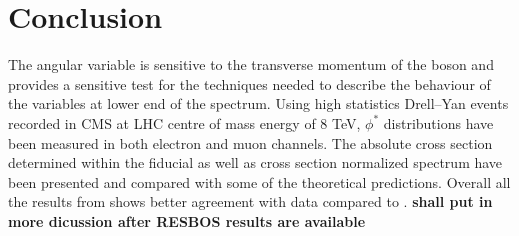 \section{Conclusion}
\label{sec:conclusion}
The  angular variable \phistar is sensitive to the transverse momentum of the \cPZ boson and provides a sensitive test for the  techniques needed to describe the behaviour of the variables at lower end of the spectrum.
Using high statistics Drell--Yan events recorded in CMS at LHC centre of mass energy of 8 TeV, $\phi^*$ distributions have been measured in both electron and muon channels. The absolute cross section determined within the fiducial as well as cross section normalized spectrum have been presented and compared with some of the theoretical predictions.   Overall all the results from \MADGRAPH shows better agreement with data compared to \POWHEG. {\bf shall put in more dicussion after RESBOS results are available}
\clearpage
